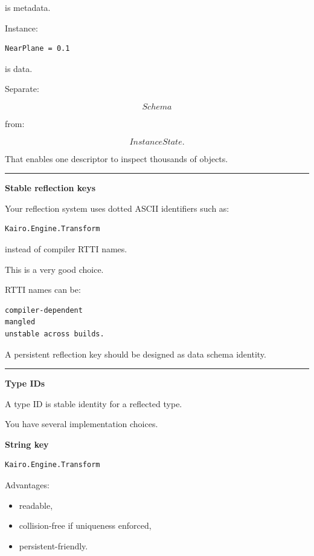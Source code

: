 is metadata.

Instance:

\begin{verbatim}
NearPlane = 0.1
\end{verbatim}

is data.

Separate:

\[
Schema
\]

from:

\[
InstanceState.
\]

That enables one descriptor to inspect thousands of objects.

\begin{center}\rule{0.5\linewidth}{0.5pt}\end{center}

\textbf{Stable reflection keys}

Your reflection system uses dotted ASCII identifiers such as:

\begin{verbatim}
Kairo.Engine.Transform
\end{verbatim}

instead of compiler RTTI names.

This is a very good choice.

RTTI names can be:

\begin{verbatim}
compiler-dependent
mangled
unstable across builds.
\end{verbatim}

A persistent reflection key should be designed as data schema identity.

\begin{center}\rule{0.5\linewidth}{0.5pt}\end{center}

\textbf{Type IDs}

A type ID is stable identity for a reflected type.

You have several implementation choices.

\textbf{String key}

\begin{verbatim}
Kairo.Engine.Transform
\end{verbatim}

Advantages:

\begin{itemize}
\tightlist
\item
  readable,
\item
  collision-free if uniqueness enforced,
\item
  persistent-friendly.
\end{itemize}

